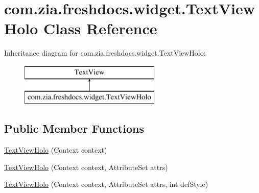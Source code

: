 \hypertarget{classcom_1_1zia_1_1freshdocs_1_1widget_1_1_text_view_holo}{\section{com.\-zia.\-freshdocs.\-widget.\-Text\-View\-Holo Class Reference}
\label{classcom_1_1zia_1_1freshdocs_1_1widget_1_1_text_view_holo}
}
Inheritance diagram for com.\-zia.\-freshdocs.\-widget.\-Text\-View\-Holo\-:\begin{figure}[H]
\begin{center}
\leavevmode
\includegraphics[height=2.000000cm]{classcom_1_1zia_1_1freshdocs_1_1widget_1_1_text_view_holo}
\end{center}
\end{figure}
\subsection*{Public Member Functions}
\begin{DoxyCompactItemize}
\item 
\hyperlink{classcom_1_1zia_1_1freshdocs_1_1widget_1_1_text_view_holo_af2a16a8e4745e6330811c5e135be5047}{Text\-View\-Holo} (Context context)
\item 
\hyperlink{classcom_1_1zia_1_1freshdocs_1_1widget_1_1_text_view_holo_a08724f9171142e40188ccd4f15d05f76}{Text\-View\-Holo} (Context context, Attribute\-Set attrs)
\item 
\hyperlink{classcom_1_1zia_1_1freshdocs_1_1widget_1_1_text_view_holo_a4159cab82e27bec203f679bbce30e513}{Text\-View\-Holo} (Context context, Attribute\-Set attrs, int def\-Style)
\end{DoxyCompactItemize}


